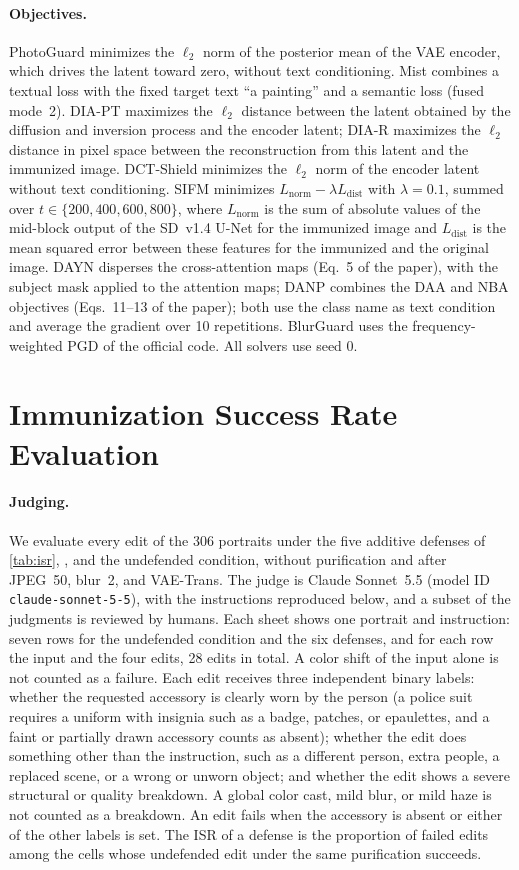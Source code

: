 \paragraph{Objectives.} PhotoGuard minimizes the $\ell_2$ norm of the posterior mean of the VAE encoder, which drives the latent toward zero, without text conditioning. Mist combines a textual loss with the fixed target text ``a painting'' and a semantic loss (fused mode~2). DIA-PT maximizes the $\ell_2$ distance between the latent obtained by the diffusion and inversion process and the encoder latent; DIA-R maximizes the $\ell_2$ distance in pixel space between the reconstruction from this latent and the immunized image. DCT-Shield minimizes the $\ell_2$ norm of the encoder latent without text conditioning. SIFM minimizes $L_{\mathrm{norm}} - \lambda L_{\mathrm{dist}}$ with $\lambda = 0.1$, summed over $t \in \{200, 400, 600, 800\}$, where $L_{\mathrm{norm}}$ is the sum of absolute values of the mid-block output of the SD~v1.4 U-Net for the immunized image and $L_{\mathrm{dist}}$ is the mean squared error between these features for the immunized and the original image. DAYN disperses the cross-attention maps (Eq.~5 of the paper), with the subject mask applied to the attention maps; DANP combines the DAA and NBA objectives (Eqs.~11--13 of the paper); both use the class name as text condition and average the gradient over 10 repetitions. BlurGuard uses the frequency-weighted PGD of the official code. All solvers use seed 0.

\section{Immunization Success Rate Evaluation}
\label{sec:supp_isr}
\paragraph{Judging.} We evaluate every edit of the 306 portraits under the five additive defenses of \cref{tab:isr}, \capg{}, and the undefended condition, without purification and after JPEG~50, blur~2, and VAE-Trans. The judge is Claude Sonnet~5.5 (model ID \texttt{claude-sonnet-5-5}), with the instructions reproduced below, and a subset of the judgments is reviewed by humans. Each sheet shows one portrait and instruction: seven rows for the undefended condition and the six defenses, and for each row the input and the four edits, 28 edits in total. A color shift of the input alone is not counted as a failure. Each edit receives three independent binary labels: whether the requested accessory is clearly worn by the person (a police suit requires a uniform with insignia such as a badge, patches, or epaulettes, and a faint or partially drawn accessory counts as absent); whether the edit does something other than the instruction, such as a different person, extra people, a replaced scene, or a wrong or unworn object; and whether the edit shows a severe structural or quality breakdown. A global color cast, mild blur, or mild haze is not counted as a breakdown. An edit fails when the accessory is absent or either of the other labels is set. The ISR of a defense is the proportion of failed edits among the cells whose undefended edit under the same purification succeeds.

